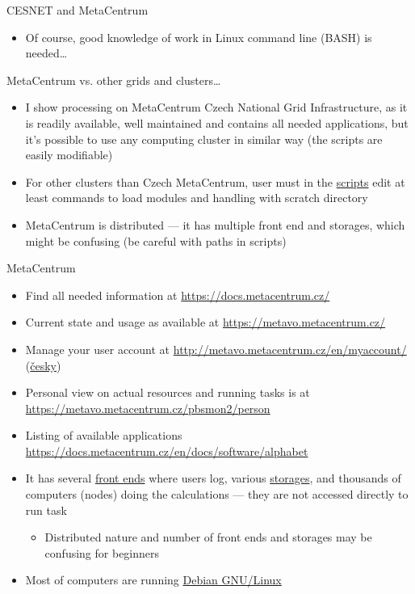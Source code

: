 \documentclass[compress,  xelatex, 11pt, xcolor=x11names, aspectratio=169,
	hyperref={
		bookmarks=true,
		unicode=true,
		colorlinks=true,
		pdftitle={HybSeq course},
		plainpages=false,
		pdfauthor={Vojtech Zeisek},
		pdfsubject={Practical processing of HybSeq target enrichment sequencing data on computing grids like MetaCentrum},
		pdfcreator={XeLaTeX},
		pdfkeywords={BASH, command line, GNU, HybSeq, Linux, MetaCentrum, sequencing shell, target enrichment},
		linkcolor=Turquoise4, %
		anchorcolor=DodgerBlue4, %
		citecolor=DodgerBlue4, %
		filecolor=DodgerBlue4, %
		menucolor=Tan4, %
		urlcolor=DarkOliveGreen4 %
		},
	url={hyphens, lowtilde} %
	]{beamer}
\begin{document}
\begin{frame}[allowframebreaks]{CESNET and MetaCentrum}
\begin{itemize}
		\item Of course, good knowledge of work in Linux command line (BASH) is needed\ldots
	\end{itemize}
	\vfill
	\begin{alertblock}{MetaCentrum vs. other grids and clusters\ldots}
	\begin{itemize}
		\item I show processing on MetaCentrum Czech National Grid Infrastructure, as it is readily available, well maintained and contains all needed applications, but it's possible to use any computing cluster in similar way (the scripts are easily modifiable)
		\item For other clusters than Czech MetaCentrum, user must in the \href{https://github.com/V-Z/hybseq-scripts}{scripts} edit at least commands to load modules and handling with scratch directory
		\item MetaCentrum is distributed --- it has multiple front end and storages, which might be confusing (be careful with paths in scripts)
	\end{itemize}
	\end{alertblock}
	\vfill
\end{frame}

\begin{frame}{MetaCentrum}
	\begin{itemize}
		\item Find all needed information at \url{https://docs.metacentrum.cz/}
		\item Current state and usage as available at \url{https://metavo.metacentrum.cz/}
		\item Manage your user account at \url{http://metavo.metacentrum.cz/en/myaccount/} (\href{https://metavo.metacentrum.cz/cs/myaccount/}{česky})
		\item Personal view on actual resources and running tasks is at \url{https://metavo.metacentrum.cz/pbsmon2/person}
		\item Listing of available applications \url{https://docs.metacentrum.cz/en/docs/software/alphabet}
		\item It has several \href{https://docs.metacentrum.cz/en/docs/access/log-in}{front ends} where users log, various \href{https://docs.metacentrum.cz/en/docs/data/large-data}{storages}, and thousands of computers (nodes) doing the calculations --- they are not accessed directly to run task
		\begin{itemize}
			\item Distributed nature and number of front ends and storages may be confusing for beginners
		\end{itemize}
		\item Most of computers are running \href{https://www.debian.org/}{Debian GNU/Linux}
	\end{itemize}
\end{frame}
\end{document}
